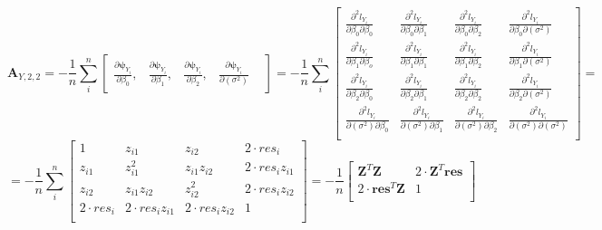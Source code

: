 \documentclass[]{article}
\begin{document}
\[
\pmb{A}_{Y,2,2} = -\frac{1}{n}\sum_i^n\begin{bmatrix}
    \frac{\partial \pmb{\psi}_{Y_i}}{ \partial \beta_0},  &
    \frac{\partial \pmb{\psi}_{Y_i}}{ \partial \beta_1}, &
    \frac{\partial \pmb{\psi}_{Y_i}}{ \partial \beta_2}, &
    \frac{\partial \pmb{\psi}_{Y_i}}{ \partial (\sigma^2)} &
\end{bmatrix}
 =-\frac{1}{n}\sum_i^n\begin{bmatrix}
    \frac{\partial^2 l_{Y_i}}{ \partial \beta_0\partial \beta_0}  & \frac{\partial^2 l_{Y_i}}{ \partial \beta_0\partial \beta_1} & \frac{\partial^2 l_{Y_i}}{ \partial \beta_0\partial \beta_2} & \frac{\partial^2 l_{Y_i}}{ \partial \beta_0 \partial (\sigma^2)}\\
    \frac{\partial^2 l_{Y_i}}{ \partial \beta_1\partial \beta_o}  & \frac{\partial^2 l_{Y_i}}{ \partial \beta_1\partial \beta_1} & \frac{\partial^2 l_{Y_i}}{ \partial \beta_1\partial \beta_2} & \frac{\partial^2 l_{Y_i}}{ \partial \beta_1 \partial (\sigma^2)}\\
    \frac{\partial^2 l_{Y_i}}{ \partial \beta_2\partial \beta_0}  & \frac{\partial^2 l_{Y_i}}{ \partial \beta_2\partial \beta_1} & \frac{\partial^2 l_{Y_i}}{ \partial \beta_2\partial \beta_2} & \frac{\partial^2 l_{Y_i}}{ \partial \beta_2 \partial (\sigma^2)}\\
    \frac{\partial^2 l_{Y_i}}{ \partial (\sigma^2) \partial \beta_0}  & \frac{\partial^2 l_{Y_i}}{ \partial (\sigma^2) \partial \beta_1} & \frac{\partial^2 l_{Y_i}}{ \partial (\sigma^2)\partial \beta_2} & \frac{\partial^2 l_{Y_i}}{ \partial (\sigma^2) \partial (\sigma^2)}\\
\end{bmatrix} =
\]
\[
  =-\frac{1}{n}\sum_i^n\begin{bmatrix}
    1   &  z_{i1}   & z_{i2}  &  2 \cdot res_i\\
    z_{i1}   &  z_{i1}^2   & z_{i1}z_{i2}  &  2 \cdot res_iz_{i1} \\
    z_{i2}   &  z_{i1}z_{i2}   & z_{i2}^2  &  2 \cdot res_iz_{i2}  \\
    2 \cdot res_i   & 2 \cdot res_iz_{i1}   & 2 \cdot res_iz_{i2}  &  1 \\
\end{bmatrix}=-\frac{1}{n}
\begin{bmatrix}
  \pmb{Z}^T\pmb{Z} & 2 \cdot \pmb{Z}^T \pmb{res}\\
  2 \cdot \pmb{res}^T\pmb{Z} & 1\\
  \end{bmatrix}
\]
\end{document}
